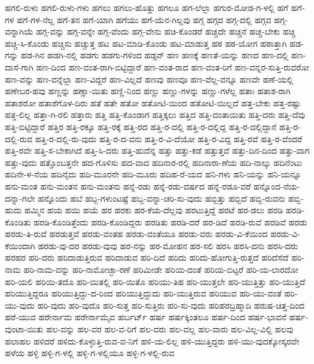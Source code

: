 ಹಗಲಿ-ರುಳು
ಹಗಲಿ-ರುಳು-ಗಳು
ಹಗಲು
ಹಗಲು-ಹೊತ್ತು
ಹಗಲೂ
ಹಗ-ಲೆಲ್ಲಾ
ಹಗುರ-ಮೋಡ-ಗ-ಳಲ್ಲಿ
ಹಗೆ
ಹಗೆ-ಗಳ
ಹಗೆ-ಗಳ-ನೆಲ್ಲ
ಹಗೆ-ತನ
ಹಗೆ-ಯಾಗಿ
ಹಗೆಯು
ಹಗೆ-ಯೆನ-ಗಿಲ್ಲವು
ಹಗ್ಗ
ಹಗ್ಗದ
ಹಗ್ಗ-ದಲ್ಲಿ
ಹಗ್ಗವ
ಹಗ್ಗ-ವನ್ನಾಗಿಯೆ
ಹಗ್ಗ-ವನ್ನು
ಹಗ್ಗ-ವನ್ನೇ
ಹಗ್ಗ-ವೆಂದು
ಹಗ್ಗ-ವೇನು
ಹಚಿ-ಕೊಂಡರೆ
ಹಚ್ಚದೇ
ಹಚ್ಚನೆ
ಹಚ್ಚ-ಬೇಕು
ಹಚ್ಚಿ
ಹಚ್ಚಿ-ಸಿ-ಕೊಂಡು
ಹಚ್ಚಿಸು
ಹಚ್ಚುತ್ತ
ಹಟ
ಹಟ-ಮಾಡಿ-ಕೊಂಡು
ಹಟ-ಮಾಡುತ್ತ
ಹಠ
ಹಠ-ಯೋಗ
ಹಠಾತ್ತಾಗಿ
ಹಡ-ಗನ್ನು
ಹಡ-ಗಿನ
ಹಡಗಿ-ನಲ್ಲಿ
ಹಡಗು
ಹಡಗು-ಗಳಿಂದ
ಹಡ್ಸನ್
ಹಣ
ಹಣಕ್ಕೆ
ಹಣತೆ-ಯನ್ನು
ಹಣದ
ಹಣ-ದಲ್ಲಿ
ಹಣ-ದಾಸೆ-ಗಾಗಿ
ಹಣ-ದಿಂದ
ಹಣ-ವಂತ-ರಾಗಿ-ಬಿಟ್ಟಿದ್ದಾರೆ
ಹಣ-ವಂತ-ರಾದ
ಹಣ-ವಂತ-ರಿಗೆ
ಹಣ-ವನ್ನರ-ಸುತ್ತಿ-ರುವರೋ
ಹಣ-ವನ್ನು
ಹಣ-ವನ್ನೆಲ್ಲಾ
ಹಣ-ವಿದ್ದರೆ
ಹಣ-ವಿಲ್ಲದೆ
ಹಣವು
ಹಣವೂ
ಹಣ-ವೆಲ್ಲ-ವನ್ನೂ
ಹಣವೇ
ಹಣೆ-ಯಲ್ಲಿ
ಹಣೇಬರ-ಹವು
ಹಣ್ಣನ್ನು
ಹಣ್ಣಾ-ಯಿತು
ಹಣ್ಣಿ-ನಿಂದ
ಹಣ್ಣು
ಹಣ್ಣು-ಗಳನ್ನು
ಹಣ್ಣು-ಗಳೆಲ್ಲ
ಹತಾಃ
ಹತಾಶ-ರಾಗಿ
ಹತಾಶರೋ
ಹತಾಶೆಗೊಳ-ದಿರು
ಹತೆ
ಹತೇ
ಹತೋ
ಹತೋಟಿ-ಯಿಂದ
ಹತೋಟಿ-ಯಿಲ್ಲದೆ
ಹತ್ತ-ಬೇಕು
ಹತ್ತ-ರಷ್ಟು
ಹತ್ತ-ಲಿಲ್ಲ
ಹತ್ತಾ-ಗಿ-ರಲಿ
ಹತ್ತಾರು
ಹತ್ತಿ
ಹತ್ತಿ-ಕೊಂಡಾಗ
ಹತ್ತಿಕ್ಕಲು
ಹತ್ತಿದ
ಹತ್ತಿ-ದಂತಾಯಿತು
ಹತ್ತಿ-ದರು
ಹತ್ತಿ-ದೆವು
ಹತ್ತಿ-ಬಿಟ್ಟಿದ್ದಾರೆ
ಹತ್ತಿರ
ಹತ್ತಿ-ರಕ್ಕೂ
ಹತ್ತಿ-ರಕ್ಕೆ
ಹತ್ತಿ-ರದ
ಹತ್ತಿ-ರ-ದಲ್ಲಿ
ಹತ್ತಿ-ರ-ದಲ್ಲಿದ್ದ
ಹತ್ತಿ-ರ-ದಲ್ಲಿದ್ದಾನೆ
ಹತ್ತಿ-ರ-ದಲ್ಲಿ-ರುವ
ಹತ್ತಿ-ರ-ದಲ್ಲಿ-ರು-ವುದು
ಹತ್ತಿ-ರ-ದ-ವನು
ಹತ್ತಿ-ರ-ವಿ-ದೆಯೋ
ಹತ್ತಿ-ರ-ವಿದ್ದ
ಹತ್ತಿ-ರವೆ
ಹತ್ತಿ-ರ-ವೆಂದರೆ
ಹತ್ತಿ-ರವೇ
ಹತ್ತಿ-ಸ-ಬೇಕಾಗಿದೆ
ಹತ್ತಿ-ಸಿ-ದರು
ಹತ್ತಿ-ಹುದೆನ್ನ
ಹತ್ತು
ಹತ್ತು-ಕಡೆ
ಹತ್ತುತ್ತವೆ
ಹತ್ತು-ದಿನ-ದಿಂದ
ಹತ್ತು-ವಾಗ
ಹತ್ತು-ವುದು
ಹತ್ತೊಂಬತ್ತನೇ
ಹದ-ಗೊಳಿಸು
ಹದ-ವಾದ
ಹದಿನಾರ-ರಲ್ಲಿ
ಹದಿನಾರಾ-ಣೆಯ
ಹದಿ-ನಾಲ್ಕು
ಹದಿನೆಂಟು
ಹದಿನೇ-ಳ-ನೆಯ
ಹದಿನೈದು
ಹದಿ-ಮೂರನೇ
ಹದಿ-ಮೂರು
ಹದಿಹ-ರೆ-ಯದ
ಹನಿ-ಗಳು
ಹನಿ-ಯನ್ನು
ಹನಿ-ಯನ್ನೂ
ಹನು-ಮಂತ
ಹನು-ಮಂತನ
ಹನು-ಮಂತನು
ಹನ್ನೆ-ರಡು
ಹನ್ನೆ-ರಡು-ವರ್ಷದ
ಹನ್ನೆ-ರಡೂ-ವರೆ
ಹನ್ನೊಂದ-ನೆಯ-ದನ್ನಾ-ಗಲೇ
ಹನ್ನೊಂದು
ಹಬೆ
ಹಬ್ಬ-ಗಳುಂಟಷ್ಟೆ
ಹಬ್ಬ-ವನ್ನಾ-ಚರಿ-ಸು-ವುದು
ಹಬ್ಬಿತ್ತು
ಹಬ್ಬಿದೆ
ಹಬ್ಬಿ-ರುವನು
ಹಬ್ಬಿ-ಹುದು
ಹಮ್ಮಿನ
ಹಯ
ಹಯಿ
ಹಯೆ
ಹರ
ಹರಕು
ಹರ-ಕೆಯ-ದೆಲ್ಲವು
ಹರಟುತ್ತಿದ್ದೆ
ಹರಟೆ
ಹರ-ಡಲು
ಹರಡಿ
ಹರಡಿ-ಕೊಂಡಿತು
ಹರಡಿ-ಕೊಂಡಿತ್ತೆಂದು
ಹರಡಿ-ಕೊಂಡಿದ್ದರು
ಹರಡಿತು
ಹರಡಿ-ದರೆ
ಹರ-ಡಿದೆ
ಹರಡಿ-ರುವೆ
ಹರಡಿವೆ
ಹರಡು
ಹರಡು-ತಿ-ರುವೆ
ಹರಡುತ್ತವೆ
ಹರಡು-ವಂತಹ
ಹರಡು-ವಂತೆಯೂ
ಹರಡು-ವರು
ಹರಡು-ವಿ-ಕೆಯಿಂದ
ಹರಡು-ವಿ-ಕೆಯಿಂದಾಗಿ
ಹರಡು-ವು-ದರ
ಹರಡು-ವುವು
ಹರ-ನನ್ನು
ಹರ-ಮೋಹನ
ಹರ-ಸಲಿ
ಹರಸಿ
ಹರಸಿ-ದನು
ಹರಸಿ-ದರು
ಹರಹರ
ಹರಿ-ದರು
ಹರಿದಾಡುತ್ತಿರುವ
ಹರಿದಾಡುವ
ಹರಿ-ದಿದೆ
ಹರಿದು
ಹರಿದು-ಹೋಗುತ್ತಿ-ರುತ್ತದೆ
ಹರಿದೆಸೆದೆ
ಹರಿ-ನಾಮ
ಹರಿ-ನಾಮ-ವನ್ನು
ಹರಿ-ನಾಮೋಚ್ಛಾ-ರಣೆ
ಹರಿಮೀಡೇ
ಹರಿಯ-ದಂತೆ
ಹರಿಯ-ಬಿಟ್ಟರೆ
ಹರಿ-ಯ-ಲಾರದೋ
ಹರಿ-ಯಲಿ
ಹರಿಯಿ-ತದೊ
ಹರಿ-ಯಿತಲ್ಲಿ
ಹರಿ-ಯಿತೊ
ಹರಿಯು-ತಿಹ
ಹರಿ-ಯುತ್ತಲೇ
ಹರಿ-ಯುತ್ತಿತ್ತು
ಹರಿ-ಯುತ್ತಿದೆ
ಹರಿಯುತ್ತಿದ್ದರೂ
ಹರಿಯುತ್ತಿದ್ದು-ದ-ರಿಂದ
ಹರಿಯುತ್ತಿದ್ದುದು
ಹರಿ-ಯುತ್ತಿರುವ
ಹರಿಯುವ
ಹರಿ-ಯು-ವಂತೆ
ಹರಿ-ಯು-ವುದು
ಹರಿ-ವುದು
ಹರಿ-ವುದೊ
ಹರಿ-ಸುತ್ತ
ಹರಿ-ಸುತ್ತಿರು
ಹರಿ-ಸು-ವುದು
ಹರಿಹರಬ್ರಹ್ಮಾದಿ
ಹರುಷ-ಚಿತ್ತ-ದಿಂದ
ಹರೆ-ಯುವ
ಹರೇರ್ನಾಮ
ಹರೇರ್ನಾಮೈವ
ಹರ್ಬರ್ಟ್
ಹರ್ಷ
ಹರ್ಷಕ್ಕಿಂತಲೂ
ಹರ್ಷ-ದಿಂದ
ಹರ್ಷ-ಭಾವನೆ
ಹರ್ಷ-ವುಂಟಾ-ಯಿತು
ಹಲ-ವನ್ನು
ಹಲ-ವರ
ಹಲ-ವ-ರಿಗೆ
ಹಲ-ವರು
ಹಲ-ವಲ್ಲ
ಹಲ-ವಾರು
ಹಲ-ವಿಲ್ಲ-ವಿಲ್ಲಿ
ಹಲವು
ಹಲಾಹಲ
ಹಳಿದರೆ
ಹಳಿದು-ಕೊಳ್ಳುತ್ತಿ-ರುವ-ವ-ನಿಗೆ
ಹಳಿ-ಯ-ಲಿಲ್ಲ
ಹಳಿ-ಯುತ್ತಿದ್ದರು
ಹಳಿ-ಯು-ವುದಕ್ಕೋಸ್ಕರವೇ
ಹಳೆಯ
ಹಳ್ಳಿ
ಹಳ್ಳಿ-ಗ-ಳಲ್ಲಿ
ಹಳ್ಳಿ-ಗ-ಳಲ್ಲಿಯೂ
ಹಳ್ಳಿ-ಗ-ಳಲ್ಲಿ-ರುವ
